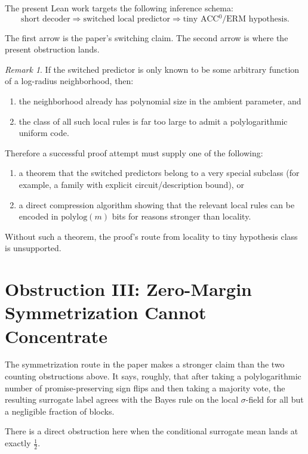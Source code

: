 \documentclass[11pt]{article}
\theoremstyle{remark}
\newtheorem{remark}[theorem]{Remark}
\begin{document}
The present Lean work targets the following inference schema:
\[
  \text{short decoder}
  \Longrightarrow
  \text{switched local predictor}
  \Longrightarrow
  \text{tiny ACC$^0$/ERM hypothesis}.
\]

The first arrow is the paper's switching claim.  The second arrow is where the present obstruction
lands.

\begin{remark}
If the switched predictor is only known to be some arbitrary function of a log-radius neighborhood,
then:
\begin{enumerate}[leftmargin=1.5em]
  \item the neighborhood already has polynomial size in the ambient parameter, and
  \item the class of all such local rules is far too large to admit a polylogarithmic uniform code.
\end{enumerate}
\end{remark}

Therefore a successful proof attempt must supply one of the following:
\begin{enumerate}[leftmargin=1.5em]
  \item a theorem that the switched predictors belong to a very special subclass
  (for example, a family with explicit circuit/description bound), or
  \item a direct compression algorithm showing that the relevant local rules can be encoded in
  \(\mathrm{polylog}(m)\) bits for reasons stronger than locality.
\end{enumerate}

Without such a theorem, the proof's route from locality to tiny hypothesis class is unsupported.

\section{Obstruction III: Zero-Margin Symmetrization Cannot Concentrate}

The symmetrization route in the paper makes a stronger claim than the two counting obstructions
above.  It says, roughly, that after taking a polylogarithmic number of promise-preserving sign
flips and then taking a majority vote, the resulting surrogate label agrees with the Bayes rule on
the local $\sigma$-field for all but a negligible fraction of blocks.

There is a direct obstruction here when the conditional surrogate mean lands at exactly
\(\tfrac12\).
\end{document}
